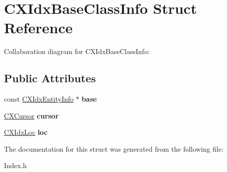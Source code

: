 \hypertarget{structCXIdxBaseClassInfo}{}\section{C\+X\+Idx\+Base\+Class\+Info Struct Reference}
\label{structCXIdxBaseClassInfo}


Collaboration diagram for C\+X\+Idx\+Base\+Class\+Info\+:
\subsection*{Public Attributes}
\begin{DoxyCompactItemize}
\item 
\mbox{\label{structCXIdxBaseClassInfo_a5cff665cfaf9373767770fb22455bed9}} 
const \hyperlink{structCXIdxEntityInfo}{C\+X\+Idx\+Entity\+Info} $\ast$ {\bfseries base}
\item 
\mbox{\label{structCXIdxBaseClassInfo_a6cfdb0b1f7f50131ab1ef4d2259fcd30}} 
\hyperlink{structCXCursor}{C\+X\+Cursor} {\bfseries cursor}
\item 
\mbox{\label{structCXIdxBaseClassInfo_a93006e043cbcb21883be8de1a1335026}} 
\hyperlink{structCXIdxLoc}{C\+X\+Idx\+Loc} {\bfseries loc}
\end{DoxyCompactItemize}


The documentation for this struct was generated from the following file\+:\begin{DoxyCompactItemize}
\item 
Index.\+h\end{DoxyCompactItemize}
